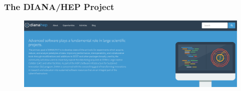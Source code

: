 \begin{frame}
\frametitle{The DIANA/HEP Project}

\begin{figure}[htbp]
\begin{center}
\includegraphics[width=1.0\textwidth]{images/20160610-diana-hep-banner.png}
\end{center}
\end{figure}


\end{frame}


